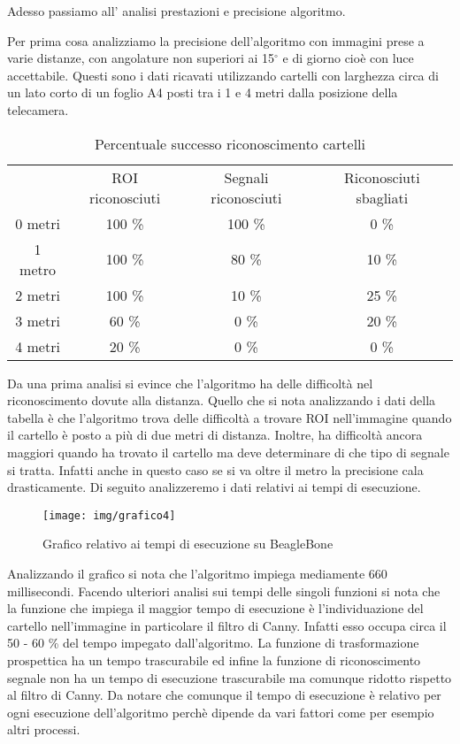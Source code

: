 	Adesso passiamo all' analisi prestazioni e precisione algoritmo.

	Per prima cosa analizziamo la precisione dell'algoritmo con immagini prese a varie distanze, con angolature non superiori ai 15$^{\circ}$ e di giorno cioè con luce accettabile. Questi sono i dati ricavati utilizzando cartelli con larghezza circa di un lato corto di un foglio A4 posti tra i 1 e 4 metri dalla posizione della telecamera.

	\begin{table}[h]
		\centering
		\begin{tabular}{cccc}
		        & ROI riconosciuti & Segnali riconosciuti & Riconosciuti sbagliati \\
			0 metri & 100 \%                & 100 \%  &	0 \%             \\
			1 metro & 100 \%                & 80 \%   &	10 \%               \\
			2 metri & 100 \%                 & 10 \%  &	25 \%  	            \\
			3 metri & 60 \%                  & 0 \%   &	20 \% 	              \\
			4 metri & 20 \%                  & 0 \%   &	0 \% 	             
		\end{tabular}
		\caption{Percentuale successo riconoscimento cartelli}
	\end{table}

    Da una prima analisi si evince che l'algoritmo ha delle difficoltà nel riconoscimento dovute alla distanza. Quello che si nota analizzando i dati della tabella è che l'algoritmo trova delle difficoltà a trovare ROI nell'immagine quando il cartello è posto a più di due metri di distanza. Inoltre, ha difficoltà ancora maggiori quando ha trovato il cartello ma deve determinare di che tipo di segnale si tratta. Infatti anche in questo caso se si va oltre il metro la precisione cala drasticamente. Di seguito analizzeremo i dati relativi ai tempi di esecuzione.

    \begin{figure}[!ht]
		\centering
		\texttt{[image: img/grafico4]}
		\caption[Grafico tempi di esecuzione]{Grafico relativo ai tempi di esecuzione su BeagleBone}
	\end{figure}

	Analizzando il grafico si nota che l'algoritmo impiega mediamente 660 millisecondi. Facendo ulteriori analisi sui tempi delle singoli funzioni si nota che la funzione che impiega il maggior tempo di esecuzione è l'individuazione del cartello nell'immagine in particolare il filtro di Canny. Infatti esso occupa circa il 50 - 60 \% del tempo impegato dall'algoritmo. La funzione di trasformazione prospettica ha un tempo trascurabile ed infine la funzione di riconoscimento segnale non ha un tempo di esecuzione trascurabile ma comunque ridotto rispetto al filtro di Canny. Da notare che comunque il tempo di esecuzione è relativo per ogni esecuzione dell'algoritmo perchè dipende da vari fattori come per esempio altri processi.

